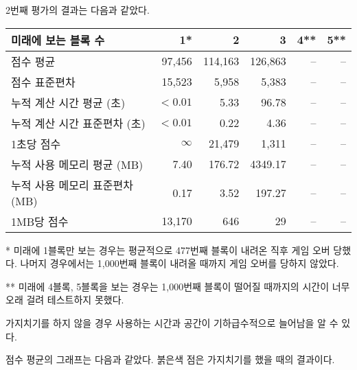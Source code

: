2번째 평가의 결과는 다음과 같았다.
\begin{center}
    \begin{tabular}{l|r|r|r|r|r}
        미래에 보는 블록 수 & 1* & 2 & 3 & 4** & 5** \\
        \hline
        점수 평균 & 97,456 & 114,163 & 126,863 & -- & -- \\
        점수 표준편차 & 15,523 & 5,958 & 5,383 & -- & -- \\
        \hline
        누적 계산 시간 평균 (초) & $<0.01$ & 5.33 & 96.78 & -- & -- \\
        누적 계산 시간 표준편차 (초) & $<0.01$ & 0.22 & 4.36 & -- & -- \\
        1초당 점수 & $\infty$ & 21,479 & 1,311 & -- & -- \\
        \hline
        누적 사용 메모리 평균 (MB) & 7.40 & 176.72 & 4349.17 & -- & -- \\
        누적 사용 메모리 표준편차 (MB) & 0.17 & 3.52 & 197.27 & -- & -- \\
        1MB당 점수 & 13,170 & 646 & 29 & -- & -- \\
    \end{tabular}
\end{center}
* 미래에 1블록만 보는 경우는 평균적으로 477번째 블록이 내려온 직후 게임 오버 당했다.
나머지 경우에서는 1,000번째 블록이 내려올 때까지 게임 오버를 당하지 않았다.

** 미래에 4블록, 5블록을 보는 경우는 1,000번째 블록이 떨어질 때까지의 시간이
너무 오래 걸려 테스트하지 못했다.

가지치기를 하지 않을 경우 사용하는 시간과 공간이 기하급수적으로 늘어남을 알 수 있다.

점수 평균의 그래프는 다음과 같았다. 붉은색 점은 가지치기를 했을 때의 결과이다.

\begin{center}
\end{center}

